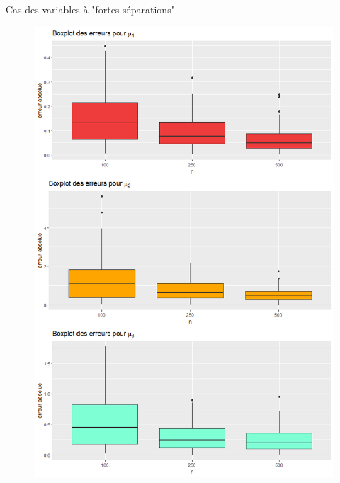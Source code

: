 \documentclass[11pt]{beamer}
\begin{document}
\begin{frame}{Cas des variables à "fortes séparations" }
\begin{figure}[htp]
{				\includegraphics[scale=0.18]{images/good_mu.png}%
			}%
		\end{figure}
	\end{frame}
\end{document}
